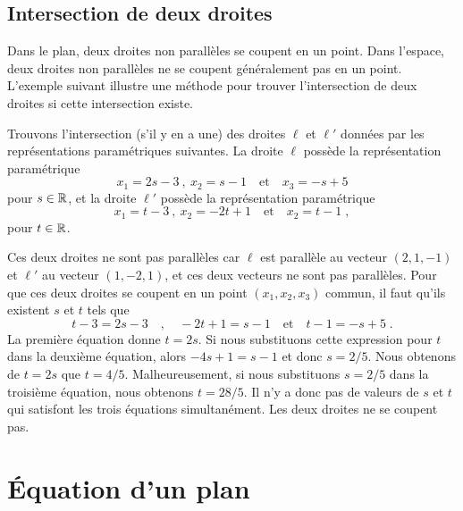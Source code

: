 {\subsection{Intersection de deux droites}

Dans le plan, deux droites non parallèles se coupent en un point.
Dans l'espace, deux droites non parallèles ne se coupent généralement
pas en un point.  L'exemple suivant illustre une méthode pour trouver
l'intersection de deux droites si cette intersection existe.

\begin{egg}
Trouvons l'intersection (s'il y en a une) des droites $\ell$ et $\ell'$
données par les représentations paramétriques suivantes.  La droite
$\ell$ possède la représentation paramétrique
\[
x_1 = 2s -3 \ , \ x_2 = s -1 \quad \text{et} \quad  x_3 = -s +5
\]
pour $s\in \mathbb{R}$, et la droite $\ell'$ possède la représentation
paramétrique
\[
x_1 = t -3 \ , \ x_2 = -2 t + 1 \quad \text{et} \quad  x_2 = t - 1 \; ,
\]
pour $t \in \mathbb{R}$.

Ces deux droites ne sont pas parallèles car $\ell$ est parallèle au
vecteur $(2,1,-1)$ et $\ell'$ au vecteur $(1,-2,1)$, et ces deux
vecteurs ne sont pas parallèles.  Pour que ces deux droites se coupent
en un point $(x_1,x_2,x_3)$ commun, il faut qu'ils existent $s$ et $t$
tels que
\[
t -3 = 2s -3 \quad , \quad -2 t + 1 = s -1 \quad \text{et} \quad
t - 1 = -s +5 \; .
\]
La première équation donne $t = 2s$.  Si nous substituons cette expression
pour $t$ dans la deuxième équation, alors $-4s +1 = s-1$ et donc
$s=2/5$.  Nous obtenons de $t = 2s$ que $t= 4/5$.  Malheureusement, si
nous substituons $s=2/5$ dans la troisième équation, nous obtenons
$t = 28/5$.  Il n'y a donc pas de valeurs de $s$ et $t$ qui satisfont
les trois équations simultanément.  Les deux droites ne se
coupent pas.
\end{egg}


\section{Équation d'un plan \eng} \label{EQU_PLAN1}

}
